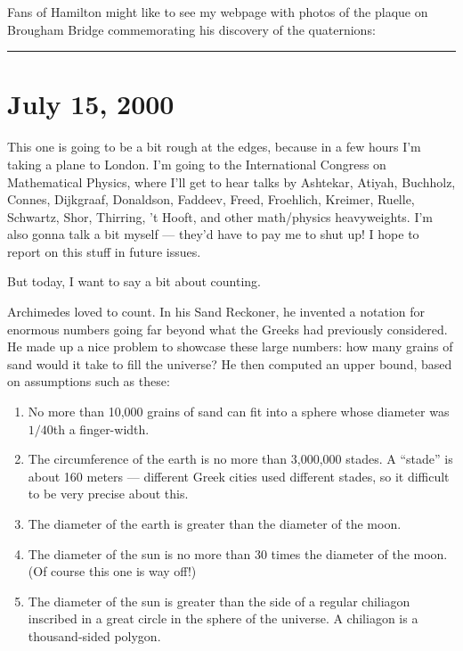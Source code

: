 \documentclass{article}
\def\tightlist{}
\renewcommand{\texttt}[1]{%
  \begingroup
  \ttfamily
  \begingroup\lccode`~=`/\lowercase{\endgroup\def~}{/\discretionary{}{}{}}%
  \begingroup\lccode`~=`[\lowercase{\endgroup\def~}{[\discretionary{}{}{}}%
  \begingroup\lccode`~=`.\lowercase{\endgroup\def~}{.\discretionary{}{}{}}%
  \catcode`/=\active\catcode`[=\active\catcode`.=\active
  \scantokens{#1\noexpand}%
  \endgroup
}
\begin{document}
Fans of Hamilton might like to see my webpage with photos of the plaque
on Brougham Bridge commemorating his discovery of the quaternions:


\begin{center}\rule{0.5\linewidth}{0.5pt}\end{center}



\hypertarget{week153}{%
\section{July 15, 2000}\label{week153}}

This one is going to be a bit rough at the edges, because in a few hours
I'm taking a plane to London. I'm going to the International Congress on
Mathematical Physics, where I'll get to hear talks by Ashtekar, Atiyah,
Buchholz, Connes, Dijkgraaf, Donaldson, Faddeev, Freed, Froehlich,
Kreimer, Ruelle, Schwartz, Shor, Thirring, 't Hooft, and other
math/physics heavyweights. I'm also gonna talk a bit myself --- they'd
have to pay me to shut up! I hope to report on this stuff in future
issues.

But today, I want to say a bit about counting.

Archimedes loved to count. In his Sand Reckoner, he invented a notation
for enormous numbers going far beyond what the Greeks had previously
considered. He made up a nice problem to showcase these large numbers:
how many grains of sand would it take to fill the universe? He then
computed an upper bound, based on assumptions such as these:

\begin{enumerate}
\def\labelenumi{\Alph{enumi})}
\item
  No more than 10,000 grains of sand can fit into a sphere whose
  diameter was \(1/40\)th a finger-width.
\item
  The circumference of the earth is no more than 3,000,000 stades. A
  ``stade'' is about 160 meters --- different Greek cities used
  different stades, so it difficult to be very precise about this.
\item
  The diameter of the earth is greater than the diameter of the moon.
\item
  The diameter of the sun is no more than 30 times the diameter of the
  moon. (Of course this one is way off!)
\item
  The diameter of the sun is greater than the side of a regular
  chiliagon inscribed in a great circle in the sphere of the universe. A
  chiliagon is a thousand-sided polygon.
\end{enumerate}
\end{document}
